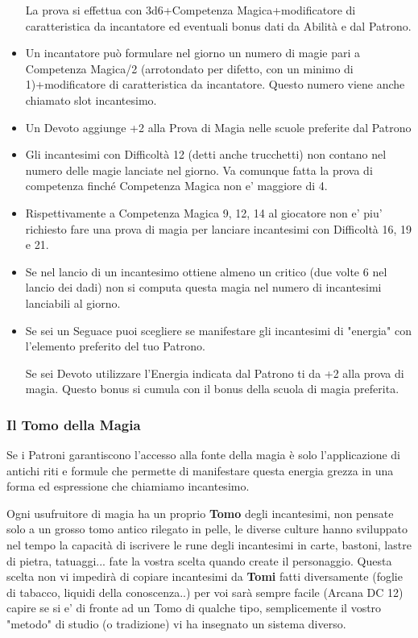 \begin{multicols}{2}
\begin{itemize}
La prova si effettua con 3d6+Competenza Magica+modificatore di caratteristica da incantatore ed eventuali bonus dati da Abilità e dal Patrono.
\item 
Un incantatore può formulare nel giorno un numero di magie pari a Competenza Magica/2 (arrotondato per difetto, con un minimo di 1)+modificatore di caratteristica da incantatore. Questo numero viene anche chiamato slot incantesimo.
\item
Un Devoto aggiunge +2 alla Prova di Magia nelle scuole preferite dal Patrono
\item
Gli incantesimi con Difficoltà 12 (detti anche trucchetti) non contano nel numero delle magie lanciate nel giorno. Va comunque fatta la prova di competenza finché Competenza Magica non e' maggiore di 4.
\item
Rispettivamente a Competenza Magica 9, 12, 14 al giocatore non e' piu' richiesto fare una prova di magia per lanciare incantesimi con Difficoltà 16, 19 e 21.
\item
Se nel lancio di un incantesimo ottiene almeno un critico (due volte 6 nel lancio dei dadi) non si computa questa magia nel numero di incantesimi lanciabili al giorno.
\item
Se sei un Seguace puoi scegliere se manifestare gli incantesimi di "energia" con l'elemento preferito del tuo Patrono.

Se sei Devoto utilizzare l'Energia indicata dal Patrono ti da +2 alla prova di magia. Questo bonus si cumula con il bonus della scuola di magia preferita.
\end{itemize}


\subsubsection{Il Tomo della Magia}

Se i Patroni garantiscono l'accesso alla fonte della magia è solo l'applicazione di antichi riti e formule che permette di manifestare questa energia grezza in una forma ed espressione che chiamiamo incantesimo.

Ogni usufruitore di magia ha un proprio \textbf{Tomo} degli incantesimi, non pensate solo a un grosso tomo antico rilegato in pelle, le diverse culture hanno sviluppato nel tempo la capacità di iscrivere le rune degli incantesimi in carte, bastoni, lastre di pietra, tatuaggi... fate la vostra scelta quando create il personaggio.
Questa scelta non vi impedirà di copiare incantesimi da \textbf{Tomi} fatti diversamente (foglie di tabacco, liquidi della conoscenza..) per voi sarà sempre facile (Arcana DC 12) capire se si e' di fronte ad un Tomo di qualche tipo, semplicemente il vostro "metodo" di studio (o tradizione) vi ha insegnato un sistema diverso.


\end{multicols}
